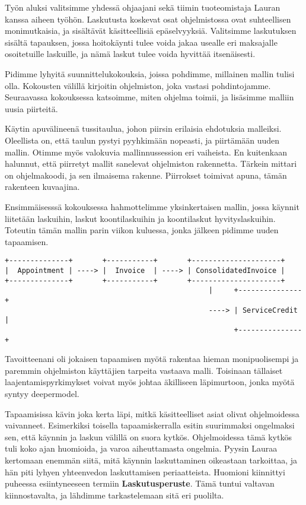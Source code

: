 Työn aluksi valitsimme yhdessä ohjaajani sekä tiimin tuoteomistaja
Lauran kanssa aiheen työhön. Laskutusta koskevat osat ohjelmistossa ovat
suhteellisen monimutkaisia, ja sisältävät käsitteellisiä epäselvyyksiä.
Valitsimme laskutuksen sisältä tapauksen, jossa hoitokäynti tulee voida
jakaa usealle eri maksajalle osoitetuille laskuille, ja nämä laskut
tulee voida hyvittää itsenäisesti.

Pidimme lyhyitä suunnittelukokouksia, joissa pohdimme, millainen mallin
tulisi olla. Kokousten välillä kirjoitin ohjelmiston, joka vastasi
pohdintojamme. Seuraavassa kokouksessa katsoimme, miten ohjelma toimii,
ja lisäsimme malliin uusia piirteitä.

Käytin apuvälineenä tussitaulua, johon piirsin erilaisia ehdotuksia
malleiksi. Oleellista on, että taulun pystyi pyyhkimään nopeasti, ja
piirtämään uuden mallin. Otimme myös valokuvia mallinnussession eri
vaiheista. En kuitenkaan halunnut, että piirretyt mallit sanelevat
ohjelmiston rakennetta. Tärkein mittari on ohjelmakoodi, ja sen
ilmaisema rakenne. Piirrokset toimivat apuna, tämän rakenteen kuvaajina.

Ensimmäisesssä kokouksessa hahmottelimme yksinkertaisen mallin, jossa
käynnit liitetään laskuihin, laskut koontilaskuihin ja koontilaskut
hyvityslaskuihin. Toteutin tämän mallin parin viikon kuluessa, jonka
jälkeen pidimme uuden tapaamisen.

\begin{verbatim}
+--------------+       +-----------+       +---------------------+
|  Appointment | ----> |  Invoice  | ----> | ConsolidatedInvoice |
+--------------+       +-----------+       +---------------------+
                                                |     +---------------+ 
                                                ----> | ServiceCredit | 
                                                      +---------------+ 
\end{verbatim}

Tavoitteenani oli jokaisen tapaamisen myötä rakentaa hieman
monipuolisempi ja paremmin ohjelmiston käyttäjien tarpeita vastaava
malli. Toisinaan tällaiset laajentamispyrkimykset voivat myös johtaa
äkilliseen läpimurtoon, jonka myötä syntyy
\gls{deepermodel}.\cite{evans:ddd}

Tapaamisissa kävin joka kerta läpi, mitkä käsitteelliset asiat olivat
ohjelmoidessa vaivanneet. Esimerkiksi toisella tapaamiskerralla esitin
suurimmaksi ongelmaksi sen, että käynnin ja laskun välillä on suora
kytkös. Ohjelmoidessa tämä kytkös tuli koko ajan huomioida, ja varoa
aiheuttamasta ongelmia. Pyysin Lauraa kertomaan enemmän siitä, mitä
käynnin laskuttaminen oikeastaan tarkoittaa, ja hän piti lyhyen
yhteenvedon laskuttamisen periaatteista. Huomioni kiinnittyi puheessa
esiintyneeseen termiin \textbf{Laskutusperuste}. Tämä tuntui valtavan
kiinnostavalta, ja lähdimme tarkastelemaan sitä eri puolilta.

